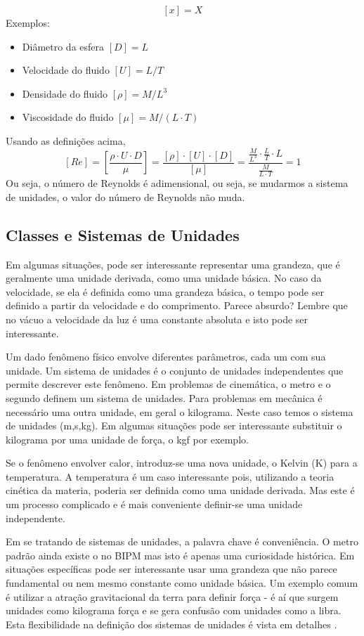 \[
  [x] = X
\]
Exemplos:
\begin{itemize}
\item Diâmetro da esfera $[D] = L$
\item Velocidade do fluido $[U] = L/T$
\item Densidade do fluido $[\rho] = M / L^3$
\item Viscosidade do fluido $[\mu] = M / (L\cdot T)$
\end{itemize}

Usando as definições acima,
\[
  [Re] = \left[ \frac{\rho \cdot U \cdot D}{\mu} \right] = \frac{[\rho]\cdot[U]\cdot [D]}{[\mu]} = \frac{\frac{M}{L^3}\cdot\frac{L}{T}\cdot L}{\frac{M}{L\cdot T}} = 1
  \]
Ou seja, o número de Reynolds é adimensional, ou seja, se mudarmos a sistema de unidades, o valor do número de Reynolds não muda.
  
\subsection{Classes e Sistemas de Unidades}


Em algumas situações, pode ser interessante representar uma grandeza, que é geralmente uma unidade derivada, como uma unidade básica. No caso da velocidade, se ela é definida como uma grandeza básica, o tempo pode ser definido a partir da velocidade e do comprimento. Parece absurdo? Lembre que no vácuo a velocidade da luz é uma constante absoluta e isto pode ser interessante.

Um dado fenômeno físico envolve diferentes parâmetros, cada um com sua unidade. Um sistema de unidades é o conjunto de unidades independentes que permite descrever este fenômeno. Em problemas de cinemática, o metro e o segundo definem um sistema de unidades. Para problemas em mecânica é necessário uma outra unidade, em geral o kilograma. Neste caso temos o sistema de unidades (m,s,kg). Em algumas situações pode ser interessante substituir o kilograma por uma unidade de força, o kgf por exemplo.

Se o fenômeno envolver calor, introduz-se uma nova unidade, o Kelvin (K) para a temperatura. A temperatura é um caso interessante pois, utilizando a teoria cinética da materia, poderia ser definida como uma unidade derivada. Mas este é um processo complicado e é mais conveniente definir-se uma unidade independente.

Em se tratando de sistemas de unidades, a palavra chave é conveniência. O metro padrão ainda existe o no BIPM mas isto é apenas uma curiosidade histórica. Em situações específicas pode ser interessante usar uma grandeza que não parece fundamental ou nem mesmo constante como unidade básica. Um exemplo comum é utilizar a atração gravitacional da terra para definir força - é aí que surgem unidades como kilograma força e se gera confusão com unidades como a libra. Esta flexibilidade na definição dos sistemas de unidades é vista em detalhes .

